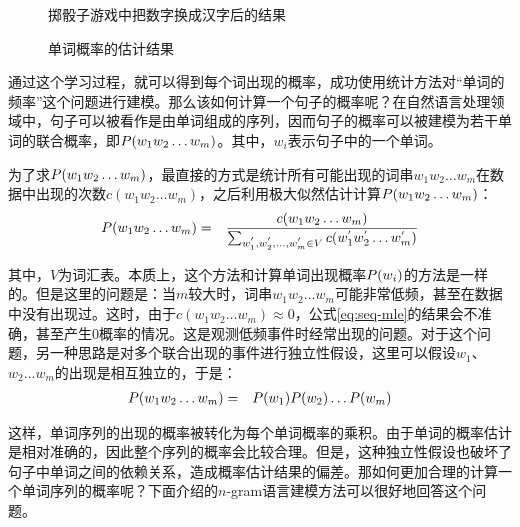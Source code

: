 \begin{figure}[htp]
\centering

\setlength{\belowcaptionskip}{-0.2cm}
\caption{掷骰子游戏中把数字换成汉字后的结果}
\label{fig:2-9}
\end{figure}

\begin{figure}[htp]
\centering

\caption{单词概率的估计结果}
\label{fig:2-10}
\end{figure}

\parinterval 通过这个学习过程，就可以得到每个词出现的概率，成功使用统计方法对“单词的频率”这个问题进行建模。那么该如何计算一个句子的概率呢？在自然语言处理领域中，句子可以被看作是由单词组成的序列，因而句子的概率可以被建模为若干单词的联合概率，即${P}(w_1 w_2 \ldots w_m)$。其中，$w_i$表示句子中的一个单词。

\parinterval 为了求${P}(w_1 w_2 \ldots w_m)$，最直接的方式是统计所有可能出现的词串$w_1 w_2 \ldots w_m$在数据中出现的次数$c(w_1 w_2 \ldots w_m)$，之后利用极大似然估计计算${P}(w_1 w_2 \ldots w_m)$：
\begin{eqnarray}
{P}(w_1 w_2 \ldots w_m) & = & \frac{c(w_1 w_2 \ldots w_m)}{\sum_{w^{'}_1, w^{'}_2,...,w^{'}_m \in V} c(w^{'}_1 w^{'}_2 \ldots w^{'}_m)} \label{eq:seq-mle}
\label{eq:2-20}
\end{eqnarray}

\noindent 其中，$V$为词汇表。本质上，这个方法和计算单词出现概率${P}(w_i)$的方法是一样的。但是这里的问题是：当$m$较大时，词串$w_1 w_2 \ldots w_m$可能非常低频，甚至在数据中没有出现过。这时，由于$c(w_1 w_2 \ldots w_m) \approx 0$，公式\eqref{eq:seq-mle}的结果会不准确，甚至产生0概率的情况。这是观测低频事件时经常出现的问题。对于这个问题，另一种思路是对多个联合出现的事件进行独立性假设，这里可以假设$w_1$、$w_2\ldots w_m$的出现是相互独立的，于是：
\begin{eqnarray}
{P}(w_1 w_2 \ldots w_m) & = & {P}(w_1) {P}(w_2) \ldots {P}(w_m) \label{eq:seq-independ}
\label{eq:2-21}
\end{eqnarray}

\noindent 这样，单词序列的出现的概率被转化为每个单词概率的乘积。由于单词的概率估计是相对准确的，因此整个序列的概率会比较合理。但是，这种独立性假设也破坏了句子中单词之间的依赖关系，造成概率估计结果的偏差。那如何更加合理的计算一个单词序列的概率呢？下面介绍的$n$-gram语言建模方法可以很好地回答这个问题。

